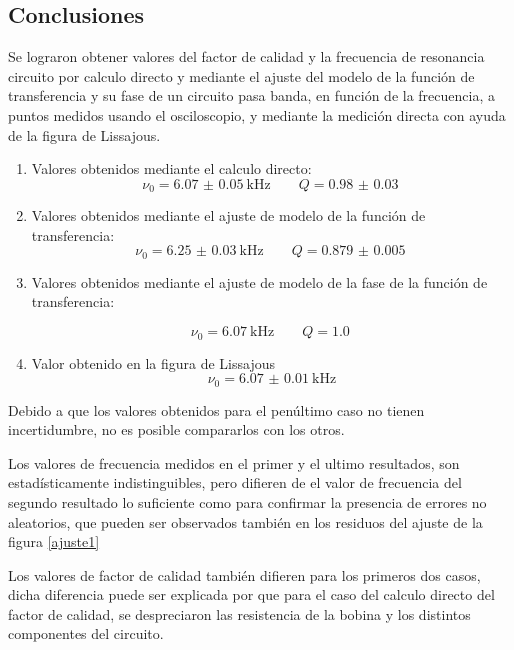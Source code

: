 \documentclass[12pt,a4paper]{article}
\begin{document}
\subsection*{Conclusiones}

Se lograron obtener valores del factor de calidad y la frecuencia de resonancia circuito por calculo directo y mediante el ajuste del modelo de la función de transferencia y su fase de un circuito pasa banda, en función de la frecuencia, a puntos medidos usando el osciloscopio, y mediante la medición directa con ayuda de la figura de Lissajous.

\hspace{1cm}

\begin{enumerate}
\item Valores obtenidos mediante el calculo directo:
$$ \nu_0 = \SI{6.07(5)}{\kilo\hertz} \qquad Q = \SI{0.98(3)}{}$$

\item Valores obtenidos mediante el ajuste de modelo de la función de transferencia:
$$\nu_0 = \SI{6.25(3)}{\kilo\hertz} \qquad Q = \SI{0.879(5)}{}$$

\item Valores obtenidos mediante el ajuste de modelo de la fase de la función de transferencia:

$$\nu_0 = \SI{6.07}{\kilo\hertz} \qquad Q = \SI{1.0}{}$$

\item Valor obtenido en la figura de Lissajous
$$ \nu_0 = \SI{6.07(1)}{\kilo\hertz} $$ 
\end{enumerate}



Debido a que los valores obtenidos para el penúltimo caso no tienen incertidumbre, no es posible compararlos con los otros.

Los valores de frecuencia medidos en el primer y el ultimo resultados, son estad\'isticamente indistinguibles, pero difieren de el valor de frecuencia del segundo resultado lo suficiente como para confirmar la presencia de errores no aleatorios, que pueden ser observados también en los residuos del ajuste de la figura \ref{ajuste1}

Los valores de factor de calidad también difieren para los primeros dos casos, dicha diferencia puede ser explicada por que para el caso del calculo directo del factor de calidad, se despreciaron las resistencia de la bobina y los distintos componentes del circuito. 
\end{document}
